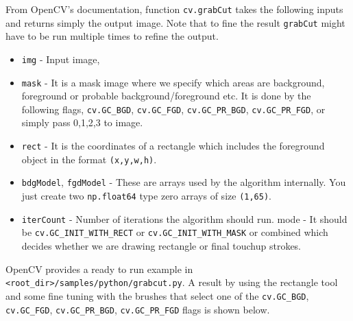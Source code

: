 \documentclass[a4paper]{article}
\begin{document}
From OpenCV's documentation, function \texttt{cv.grabCut} takes the following inputs and returns simply the output image. Note that to fine the result \texttt{grabCut} might have to be run multiple times to refine the output.
\begin{itemize}
    \item \texttt{img} - Input image,
    \item \texttt{mask} - It is a mask image where we specify which areas are background, foreground or probable background/foreground etc. It is done by the following flags, \texttt{cv.GC_BGD}, \texttt{cv.GC_FGD}, \texttt{cv.GC_PR_BGD}, \texttt{cv.GC_PR_FGD}, or simply pass 0,1,2,3 to image.
    \item \texttt{rect} - It is the coordinates of a rectangle which includes the foreground object in the format \texttt{(x,y,w,h)}.
    \item \texttt{bdgModel}, \texttt{fgdModel} - These are arrays used by the algorithm internally. You just create two \texttt{np.float64} type zero arrays of size \texttt{(1,65)}.
    \item \texttt{iterCount} - Number of iterations the algorithm should run.
mode - It should be \texttt{cv.GC_INIT_WITH_RECT} or \texttt{cv.GC_INIT_WITH_MASK} or combined which decides whether we are drawing rectangle or final touchup strokes.
\end{itemize}
OpenCV provides a ready to run example in \texttt{<root_dir>/samples/python/grabcut.py}.
A result by using the rectangle tool and some fine tuning with the brushes that select one of the \texttt{cv.GC_BGD}, \texttt{cv.GC_FGD}, \texttt{cv.GC_PR_BGD}, \texttt{cv.GC_PR_FGD} flags is shown below.
\end{document}
